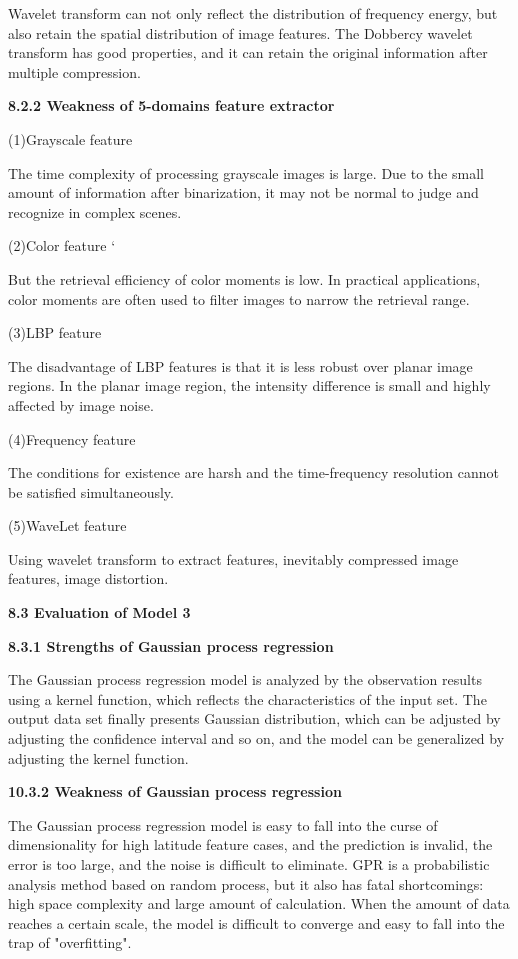\documentclass{apmcmthesis}
\begin{document}
Wavelet transform can not only reflect the distribution of frequency energy, but also retain the spatial distribution of image features. The Dobbercy wavelet transform has good properties, and it can retain the original information after multiple compression.

\noindent\textbf{8.2.2 Weakness of 5-domains feature extractor}

\noindent(1)Grayscale feature 

The time complexity of processing grayscale images is large. Due to the small amount of information after binarization, it may not be normal to judge and recognize in complex scenes.

\noindent(2)Color feature `

But the retrieval efficiency of color moments is low. In practical applications, color moments are often used to filter images to narrow the retrieval range.

\noindent(3)LBP feature 

The disadvantage of LBP features is that it is less robust over planar image regions. In the planar image region, the intensity difference is small and highly affected by image noise.

\noindent(4)Frequency feature 

The conditions for existence are harsh and the time-frequency resolution cannot be satisfied simultaneously.

\noindent(5)WaveLet feature 

Using wavelet transform to extract features, inevitably compressed image features, image distortion.

\noindent\textbf{8.3 Evaluation of Model 3}

\noindent\textbf{8.3.1 Strengths of Gaussian process regression}

The Gaussian process regression model is analyzed by the observation results using a kernel function, which reflects the characteristics of the input set. The output data set finally presents Gaussian distribution, which can be adjusted by adjusting the confidence interval and so on, and the model can be generalized by adjusting the kernel function.

\noindent\textbf{10.3.2 Weakness of Gaussian process regression}

The Gaussian process regression model is easy to fall into the curse of dimensionality for high latitude feature cases, and the prediction is invalid, the error is too large, and the noise is difficult to eliminate. GPR is a probabilistic analysis method based on random process, but it also has fatal shortcomings: high space complexity and large amount of calculation. When the amount of data reaches a certain scale, the model is difficult to converge and easy to fall into the trap of "overfitting".
\end{document}
